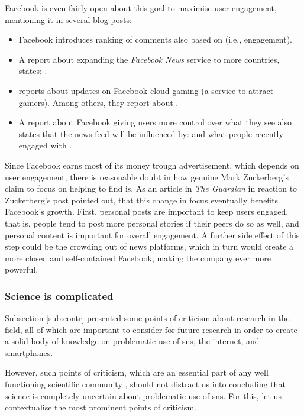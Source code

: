 Facebook is even fairly open about this goal to maximise user engagement, mentioning it in several blog posts:
\begin{itemize}
    \item \citep{shen_making_2019} Facebook introduces ranking of comments also based on  (i.e., engagement).
    \item A report about expanding the \textit{Facebook News} service to more countries, states:  \citet{brown_bringing_2020}.
    \item \citep{rubin_cloud_2020} reports about updates on Facebook cloud gaming (a service to attract gamers). Among others, they report about .
    \item A report about Facebook giving users more control over what they see also states that the news-feed will be influenced by:  and what people recently engaged with  \citep{sethuraman_more_2021}.
\end{itemize}

Since Facebook earns most of its money trough advertisement, which depends on user engagement, there is reasonable doubt in how genuine Mark Zuckerberg's claim to focus on helping to find  \citep{zuckerberg_one_2018} is.
As an article in \emph{The Guardian} in reaction to Zuckerberg's post pointed out, that this change in focus eventually benefits Facebook's growth.
First, personal posts are important to keep users engaged, that is, people tend to post more personal stories if their peers do so as well, and personal content is important for overall engagement.
A further side effect of this step could be the crowding out of news platforms, which in turn would create a more closed and self-contained Facebook, making the company ever more powerful.

\subsubsection{Science is complicated}
Subsection \ref{sub:contr} presented some points of criticism about research in the field, all of which are important to consider for future research in order to create a solid body of knowledge on problematic use of \gls{sns}, the internet, and smartphones.

However, such points of criticism, which are an essential part of any well functioning scientific community \citep{oreskes_why_2019}, should not distract us into concluding that science is completely uncertain about problematic use of \gls{sns}.
For this, let us contextualise the most prominent points of criticism.

